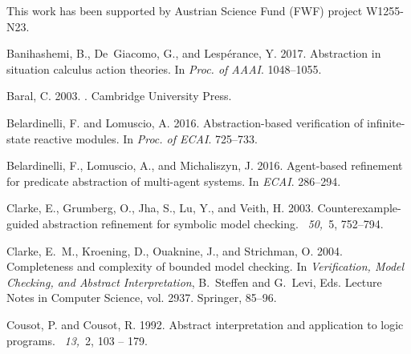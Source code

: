 \documentclass{new_tlp}
\begin{document}
This work has been supported by Austrian Science Fund (FWF) project W1255-N23.

%
%

\begin{thebibliography}{}

{\sc Banihashemi, B.}, {\sc De~Giacomo, G.}, {\sc and} {\sc Lesp{\'e}rance, Y.}
  2017.
\newblock Abstraction in situation calculus action theories.
\newblock In {\em Proc. of AAAI}. 1048--1055.

{\sc Baral, C.} 2003.
.
\newblock Cambridge University Press.

{\sc Belardinelli, F.} {\sc and} {\sc Lomuscio, A.} 2016.
\newblock Abstraction-based verification of infinite-state reactive modules.
\newblock In {\em Proc. of ECAI}. 725--733.

{\sc Belardinelli, F.}, {\sc Lomuscio, A.}, {\sc and} {\sc Michaliszyn, J.}
  2016.
\newblock Agent-based refinement for predicate abstraction of multi-agent
  systems.
\newblock In {\em ECAI}. 286--294.

{\sc Clarke, E.}, {\sc Grumberg, O.}, {\sc Jha, S.}, {\sc Lu, Y.}, {\sc and}
  {\sc Veith, H.} 2003.
\newblock Counterexample-guided abstraction refinement for symbolic model
  checking.
~{\em 50,\/}~5, 752--794.

{\sc Clarke, E.~M.}, {\sc Kroening, D.}, {\sc Ouaknine, J.}, {\sc and} {\sc
  Strichman, O.} 2004.
\newblock Completeness and complexity of bounded model checking.
\newblock In {\em Verification, Model Checking, and Abstract Interpretation},
  {B.~Steffen} {and} {G.~Levi}, Eds. Lecture Notes in Computer Science, vol.
  2937. Springer, 85--96.

{\sc Cousot, P.} {\sc and} {\sc Cousot, R.} 1992.
\newblock Abstract interpretation and application to logic programs.
~{\em 13,\/}~2, 103 -- 179.


\end{thebibliography}
\end{document}
